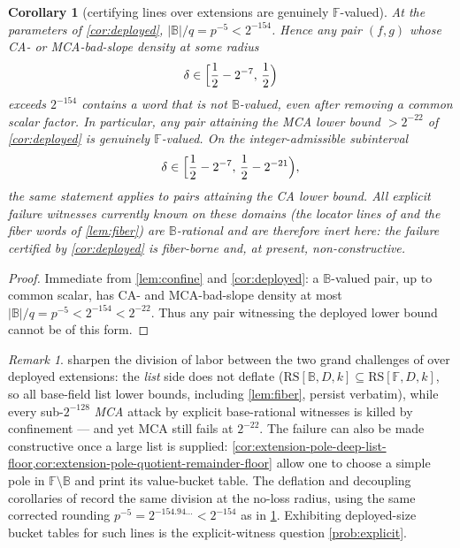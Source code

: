 \documentclass[11pt]{article}
\newtheorem{corollary}[corollary]{Corollary}
\theoremstyle{definition}
\theoremstyle{remark}
\newtheorem{remark}[remark]{Remark}
\newcommand{\F}{\mathbb{F}}
\newcommand{\B}{\mathbb{B}}
\newcommand{\RS}{\mathrm{RS}}
\begin{document}
\begin{corollary}[certifying lines over extensions are genuinely $\F$-valued]\label{cor:Fvalued}
At the parameters of \cref{cor:deployed}, $|\B|/q=p^{-5}<2^{-154}$. Hence any pair $(f,g)$ whose CA- or MCA-bad-slope density at some radius
\[
        \delta\in
        \Bigl[\frac12-2^{-7},\,\frac12\Bigr)
\]
exceeds $2^{-154}$ contains a word that is not $\B$-valued, even after removing a common scalar factor. In particular, any pair attaining the MCA lower bound $>2^{-22}$ of \cref{cor:deployed} is genuinely $\F$-valued. On the integer-admissible subinterval
\[
        \delta\in
        \Bigl[\frac12-2^{-7},\,\frac12-2^{-21}\Bigr),
\]
the same statement applies to pairs attaining the CA lower bound. All explicit failure witnesses currently known on these domains (the locator lines of \cite{Cho26a,Cho26b} and the fiber words of \cref{lem:fiber}) are $\B$-rational and are therefore inert here: the failure certified by \cref{cor:deployed} is fiber-borne and, at present, non-constructive.
\end{corollary}

\begin{proof}
Immediate from \cref{lem:confine} and \cref{cor:deployed}: a $\B$-valued pair, up to common scalar, has CA- and MCA-bad-slope density at most $|\B|/q=p^{-5}<2^{-154}<2^{-22}$. Thus any pair witnessing the deployed lower bound cannot be of this form.
\end{proof}

\begin{remark}
 sharpen the division of labor between the two grand challenges of \cite{ABF26} over deployed extensions: the \emph{list} side does not deflate ($\RS[\B,D,k]\subseteq\RS[\F,D,k]$, so all base-field list lower bounds, including \cref{lem:fiber}, persist verbatim), while every sub-$2^{-128}$ \emph{MCA} attack by explicit base-rational witnesses is killed by confinement --- and yet MCA still fails at $2^{-22}$.  The failure can also be made constructive once a large list is supplied: \cref{cor:extension-pole-deep-list-floor,cor:extension-pole-quotient-remainder-floor} allow one to choose a simple pole in $\F\setminus\B$ and print its value-bucket table. The deflation and decoupling corollaries of \cite{Cho26b} record the same division at the no-loss radius, using the same corrected rounding $p^{-5}=2^{-154.94\ldots}<2^{-154}$ as in \cref{cor:Fvalued}. Exhibiting deployed-size bucket tables for such lines is the explicit-witness question \cref{prob:explicit}.
\end{remark}
\end{document}
